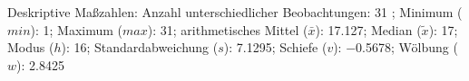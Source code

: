 				\label{tableValues:bsys01a_o}
				\vspace*{-\baselineskip}
                    \begin{noten}
                	    \note{} Deskriptive Maßzahlen:
                	    Anzahl unterschiedlicher Beobachtungen: 31%
                	    ; 
                	      Minimum ($min$): 1; 
                	      Maximum ($max$): 31; 
                	      arithmetisches Mittel ($\bar{x}$): \num[round-mode=places,round-precision=2]{17.127}; 
                	      Median ($\tilde{x}$): 17; 
                	      Modus ($h$): 16; 
                	      Standardabweichung ($s$): \num[round-mode=places,round-precision=2]{7.1295}; 
                	      Schiefe ($v$): \num[round-mode=places,round-precision=2]{-0.5678}; 
                	      Wölbung ($w$): \num[round-mode=places,round-precision=2]{2.8425}
                     \end{noten}

